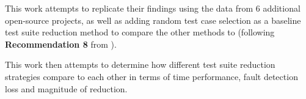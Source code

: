 This work attempts to replicate their findings using the data from
6 additional open-source projects, as well as adding random test
case selection as a baseline test suite reduction method to compare
the other methods to (following \textbf{Recommendation 8} from
\cite{khan2018systematic}).

This work then attempts to determine how different test suite reduction
strategies compare to each other in terms of time performance, fault
detection loss and magnitude of reduction.

%
%
%
%
%
%
%
